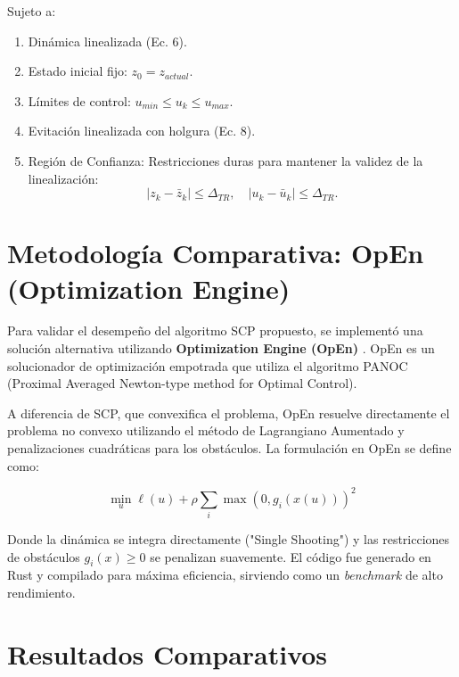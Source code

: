 \documentclass[conference]{IEEEtran}
\begin{document}
Sujeto a:
\begin{enumerate}
    \item Dinámica linealizada (Ec. 6).
    \item Estado inicial fijo: $z_0 = z_{actual}$.
    \item Límites de control: $u_{min} \le u_k \le u_{max}$.
    \item Evitación linealizada con holgura (Ec. 8).
    \item Región de Confianza: Restricciones duras para mantener la validez de la linealización:
    \begin{equation}
        |z_k - \bar{z}_k| \le \Delta_{TR}, \quad |u_k - \bar{u}_k| \le \Delta_{TR}.
    \end{equation}
\end{enumerate}

\section{Metodología Comparativa: OpEn (Optimization Engine)}

Para validar el desempeño del algoritmo SCP propuesto, se implementó una solución alternativa utilizando \textbf{Optimization Engine (OpEn)} \cite{open_solver}. OpEn es un solucionador de optimización empotrada que utiliza el algoritmo PANOC (Proximal Averaged Newton-type method for Optimal Control).

A diferencia de SCP, que convexifica el problema, OpEn resuelve directamente el problema no convexo utilizando el método de Lagrangiano Aumentado y penalizaciones cuadráticas para los obstáculos. La formulación en OpEn se define como:

\begin{equation}
    \min_{u} \ell(u) + \rho \sum_{i} \max(0, g_i(x(u)))^2
\end{equation}

Donde la dinámica se integra directamente ("Single Shooting") y las restricciones de obstáculos $g_i(x) \ge 0$ se penalizan suavemente. El código fue generado en Rust y compilado para máxima eficiencia, sirviendo como un \textit{benchmark} de alto rendimiento.

\section{Resultados Comparativos}
\end{document}
